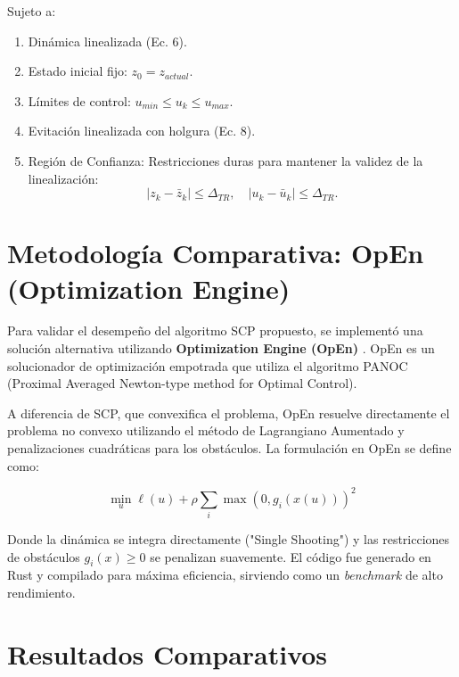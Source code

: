 \documentclass[conference]{IEEEtran}
\begin{document}
Sujeto a:
\begin{enumerate}
    \item Dinámica linealizada (Ec. 6).
    \item Estado inicial fijo: $z_0 = z_{actual}$.
    \item Límites de control: $u_{min} \le u_k \le u_{max}$.
    \item Evitación linealizada con holgura (Ec. 8).
    \item Región de Confianza: Restricciones duras para mantener la validez de la linealización:
    \begin{equation}
        |z_k - \bar{z}_k| \le \Delta_{TR}, \quad |u_k - \bar{u}_k| \le \Delta_{TR}.
    \end{equation}
\end{enumerate}

\section{Metodología Comparativa: OpEn (Optimization Engine)}

Para validar el desempeño del algoritmo SCP propuesto, se implementó una solución alternativa utilizando \textbf{Optimization Engine (OpEn)} \cite{open_solver}. OpEn es un solucionador de optimización empotrada que utiliza el algoritmo PANOC (Proximal Averaged Newton-type method for Optimal Control).

A diferencia de SCP, que convexifica el problema, OpEn resuelve directamente el problema no convexo utilizando el método de Lagrangiano Aumentado y penalizaciones cuadráticas para los obstáculos. La formulación en OpEn se define como:

\begin{equation}
    \min_{u} \ell(u) + \rho \sum_{i} \max(0, g_i(x(u)))^2
\end{equation}

Donde la dinámica se integra directamente ("Single Shooting") y las restricciones de obstáculos $g_i(x) \ge 0$ se penalizan suavemente. El código fue generado en Rust y compilado para máxima eficiencia, sirviendo como un \textit{benchmark} de alto rendimiento.

\section{Resultados Comparativos}
\end{document}
